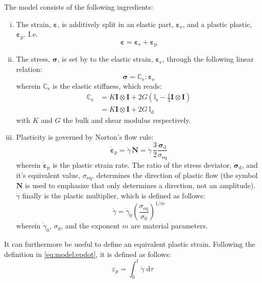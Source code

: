 \documentclass[times,namecite]{goose-article}
\begin{document}
The model consists of the following ingredients:
%
\begin{enumerate}[(i)]
%
\item The strain, $\bm{\varepsilon}$, is additively split in an elastic part, $\bm{\varepsilon}_\mathrm{e}$, and a plastic plastic, $\bm{\varepsilon}_\mathrm{p}$. I.e.
%
\begin{equation}
  \bm{\varepsilon}
  = \bm{\varepsilon}_\mathrm{e}
  + \bm{\varepsilon}_\mathrm{p}
\end{equation}
%
\item The stress, $\bm{\sigma}$, is set by to the elastic strain, $\bm{\varepsilon}_\mathrm{e}$, through the following linear relation:
%
\begin{equation}\label{eq:model:stress-elas}
  \bm{\sigma}
  = \mathbb{C}_\mathrm{e} : \bm{\varepsilon}_\mathrm{e}
\end{equation}
%
wherein $\mathbb{C}_\mathrm{e}$ is the elastic stiffness, which reads:
\begin{align}\label{eq:model:elas}
  \mathbb{C}_\mathrm{e}
  &= K \bm{I} \otimes \bm{I}
   + 2 G (\mathbb{I}_\mathrm{s} - \tfrac{1}{3} \bm{I} \otimes \bm{I} )
  \\
  &= K \bm{I} \otimes \bm{I}
  + 2 G \, \mathbb{I}_\mathrm{d}
\end{align}
with $K$ and $G$ the bulk and shear modulus respectively.
%
\item Plasticity is governed by Norton's flow rule:
%
\begin{equation}\label{eq:model:epdot}
  \dot{\bm{\varepsilon}}_\mathrm{p}
  = \dot{\gamma} \, \bm{N}
  = \dot{\gamma} \, \frac{3}{2} \frac{\bm{\sigma}_\mathrm{d}}{\sigma_\mathrm{eq}}
\end{equation}
%
wherein $\dot{\bm{\varepsilon}}_\mathrm{p}$ is the plastic strain rate. The ratio of the stress deviator, $\bm{\sigma}_\mathrm{d}$, and it's equivalent value, $\sigma_\mathrm{eq}$, determines the direction of plastic flow (the symbol $\bm{N}$ is used to emphasize that only determines a direction, not an amplitude). $\dot{\gamma}$ finally is the plastic multiplier, which is defined as follows:
%
\begin{equation}\label{eq:model:gammadot}
  \dot{\gamma}
  =
  \dot{\gamma}_0 \left( \frac{\sigma_\mathrm{eq}}{\sigma_0} \right)^{1/m}
\end{equation}
%
wherein $\dot{\gamma}_0$, $\sigma_0$, and the exponent $m$ are material parameters.
\end{enumerate}

It can furthermore be useful to define an equivalent plastic strain. Following the definition in \eqref{eq:model:epdot}, it is defined as follows:
%
\begin{equation}
  \varepsilon_\mathrm{p} = \int_0^t \dot{\gamma} \; \mathrm{d}\tau
\end{equation}
%
\end{document}
